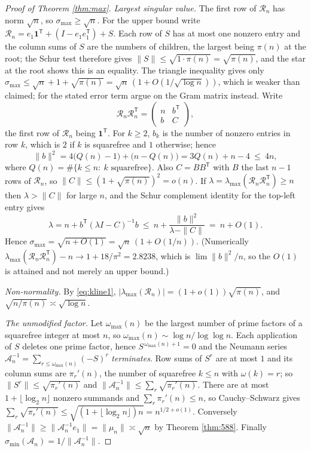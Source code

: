 \documentclass[11pt]{article}
\theoremstyle{definition}
\theoremstyle{remark}
\newcommand{\Rc}{\mathcal{R}}
\newcommand{\Ac}{\mathcal{A}}
\begin{document}
\begin{proof}[Proof of Theorem \ref{thm:max}]
\emph{Largest singular value.} The first row of $\Rc_n$ has norm $\sqrt n$, so
$\sigma_{\max}\ge\sqrt n$. For the upper bound write $\Rc_n=e_1\mathbf 1^{\mathsf
T}+ (I-e_1e_1^{\mathsf T}) + S$. Each row of $S$ has at most one nonzero entry and
the column sums of $S$ are the numbers of children, the largest being $\pi(n)$ at
the root; the Schur test therefore gives $\|S\|\le\sqrt{1\cdot\pi(n)}=\sqrt{\pi(n)}$,
and the star at the root shows this is an equality. The triangle inequality gives
only $\sigma_{\max}\le\sqrt n+1+\sqrt{\pi(n)}=\sqrt n\,(1+O(1/\sqrt{\log n}))$,
which is weaker than claimed; for the stated error term argue on the Gram matrix
instead. Write
\[
  \Rc_n\Rc_n^{\mathsf T}=\begin{pmatrix} n & b^{\mathsf T}\\ b & C\end{pmatrix},
\]
the first row of $\Rc_n$ being $\mathbf 1^{\mathsf T}$. For $k\ge2$, $b_k$ is the
number of nonzero entries in row $k$, which is $2$ if $k$ is squarefree and $1$
otherwise; hence
\[
  \|b\|^2=4\bigl(Q(n)-1\bigr)+\bigl(n-Q(n)\bigr)=3Q(n)+n-4\ \le\ 4n,
\]
where $Q(n)=\#\{k\le n:\ k\text{ squarefree}\}$. Also
$C=BB^{\mathsf T}$ with $B$ the last $n-1$ rows of $\Rc_n$, so
$\|C\|\le(1+\sqrt{\pi(n)})^2=o(n)$. If $\lambda=\lambda_{\max}(\Rc_n\Rc_n^{\mathsf
T})\ge n$ then $\lambda>\|C\|$ for large $n$, and the Schur complement identity
for the top-left entry gives
\[
  \lambda = n + b^{\mathsf T}(\lambda I-C)^{-1}b
  \ \le\ n+\frac{\|b\|^2}{\lambda-\|C\|}\ =\ n+O(1).
\]
Hence $\sigma_{\max}=\sqrt{n+O(1)}=\sqrt n\,(1+O(1/n))$. (Numerically
$\lambda_{\max}(\Rc_n\Rc_n^{\mathsf T})-n\to 1+18/\pi^2=2.8238$, which is
$\lim\|b\|^2/n$, so the $O(1)$ is attained and not merely an upper bound.)

\emph{Non-normality.} By \eqref{eq:kline1}, $|\lambda_{\max}(\Rc_n)| =
(1+o(1))\sqrt{\pi(n)}$, and $\sqrt{n/\pi(n)}\asymp\sqrt{\log n}$.

\emph{The unmodified factor.} Let $\omega_{\max}(n)$ be the largest number of prime
factors of a squarefree integer at most $n$, so $\omega_{\max}(n)\sim\log
n/\log\log n$. Each application of $S$ deletes one prime factor, hence
$S^{\,\omega_{\max}(n)+1}=0$ and the Neumann series
$\Ac_n^{-1}=\sum_{r\le\omega_{\max}(n)}(-S)^r$ \emph{terminates}. Row sums of $S^r$
are at most $1$ and its column sums are $\pi_r'(n)$, the number of squarefree $k\le
n$ with $\omega(k)=r$; so $\|S^r\|\le\sqrt{\pi_r'(n)}$ and
$\|\Ac_n^{-1}\|\le\sum_r\sqrt{\pi_r'(n)}$. There are at most
$1+\lfloor\log_2 n\rfloor$ nonzero summands and
$\sum_r\pi_r'(n)\le n$, so Cauchy--Schwarz gives
$\sum_r\sqrt{\pi_r'(n)}\le\sqrt{(1+\lfloor\log_2 n\rfloor)n}
=n^{1/2+o(1)}$. Conversely
$\|\Ac_n^{-1}\|\ge\|\Ac_n^{-1}e_1\|=\|\mu_n\|\asymp\sqrt n$ by Theorem
\ref{thm:588}. Finally $\sigma_{\min}(\Ac_n)=1/\|\Ac_n^{-1}\|$.
\end{proof}
\end{document}
